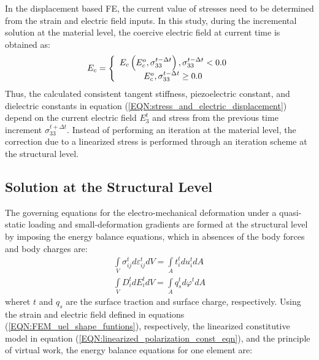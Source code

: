 In the displacement based FE, the current value of stresses need to be determined from the strain and electric field inputs. 
In this study, during the incremental solution at the material level, the coercive electric field at current time is obtained as:
\begin{equation}  
{E_c} = \left\{ {\begin{array}{*{20}{c}}
{{E_c}\left( {E_c^o,\sigma _{33}^{t - \Delta t}} \right),{\rm{  }}\sigma _{33}^{t - \Delta t} < 0.0}\\
{E_c^o,{\rm{                   }}\sigma _{33}^{t - \Delta t} \ge 0.0}
\end{array}} \right.
\label{EQN:coercive_field}
\end{equation}
Thus, the calculated consistent tangent stiffness, piezoelectric constant, and dielectric constants in equation (\ref{EQN:stress_and_electric_displacement}) depend on the current electric field $E^t_3$ and stress from the previous time increment $\sigma^{t+\Delta t}_{33}$. 
Instead of performing an iteration at the material level, the correction due to a linearized stress is performed through an iteration scheme at the structural level.







\subsection{Solution at the Structural Level}
The governing equations for the electro-mechanical deformation under a quasi-static loading and small-deformation gradients are formed at the structural level by imposing the energy balance equations, which in absences of the body forces and body charges are:
\begin{equation}  
\begin{array}{l}
\int\limits_V {\sigma _{ij}^td\varepsilon _{ij}^tdV}  = \int\limits_A {t_i^tdu_i^tdA} \\
\int\limits_V {D_i^tdE_i^tdV}  = \int\limits_A {q_s^td\varphi _{}^tdA} 
\end{array}
\label{EQN:integration}
\end{equation}
wheret $t$ and $q_s$ are the surface traction and surface charge, respectively. 
Using the strain and electric field defined in equations (\ref{EQN:FEM_uel_shape_funtions}), respectively, the linearized constitutive model in equation (\ref{EQN:linearized_polarization_const_eqn}),
 and the principle of virtual work, the energy balance equations for one element are:

